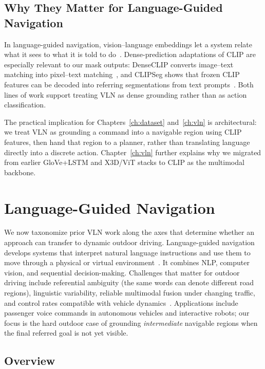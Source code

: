 \subsection{Why They Matter for Language-Guided Navigation}

In language-guided navigation, vision--language embeddings let a system relate what it sees to what it is told to do~\cite{Chen2019TOUCHDOWN}. Dense-prediction adaptations of CLIP are especially relevant to our mask outputs: DenseCLIP converts image--text matching into pixel--text matching~\cite{Rao_Zhao_Chen_Tang_Zhu_Huang_Zhou_Lu_2022}, and CLIPSeg shows that frozen CLIP features can be decoded into referring segmentations from text prompts~\cite{luddecke2022clipseg}. Both lines of work support treating VLN as dense grounding rather than as action classification.

The practical implication for Chapters~\ref{ch:dataset} and~\ref{ch:vln} is architectural: we treat VLN as grounding a command into a navigable region using CLIP features, then hand that region to a planner, rather than translating language directly into a discrete action. Chapter~\ref{ch:vln} further explains why we migrated from earlier GloVe+LSTM and X3D/ViT stacks to CLIP as the multimodal backbone.

\section{Language-Guided Navigation}

We now taxonomize prior VLN work along the axes that determine whether an approach can transfer to dynamic outdoor driving. Language-guided navigation develops systems that interpret natural language instructions and use them to move through a physical or virtual environment~\cite{anderson2018vision}. It combines NLP, computer vision, and sequential decision-making. Challenges that matter for outdoor driving include referential ambiguity (the same words can denote different road regions), linguistic variability, reliable multimodal fusion under changing traffic, and control rates compatible with vehicle dynamics~\cite{Dominguez2015,Codevilla_Muller_Lopez_Koltun_Dosovitskiy_2018}. Applications include passenger voice commands in autonomous vehicles and interactive robots; our focus is the hard outdoor case of grounding \emph{intermediate} navigable regions when the final referred goal is not yet visible.

\subsection{Overview}

